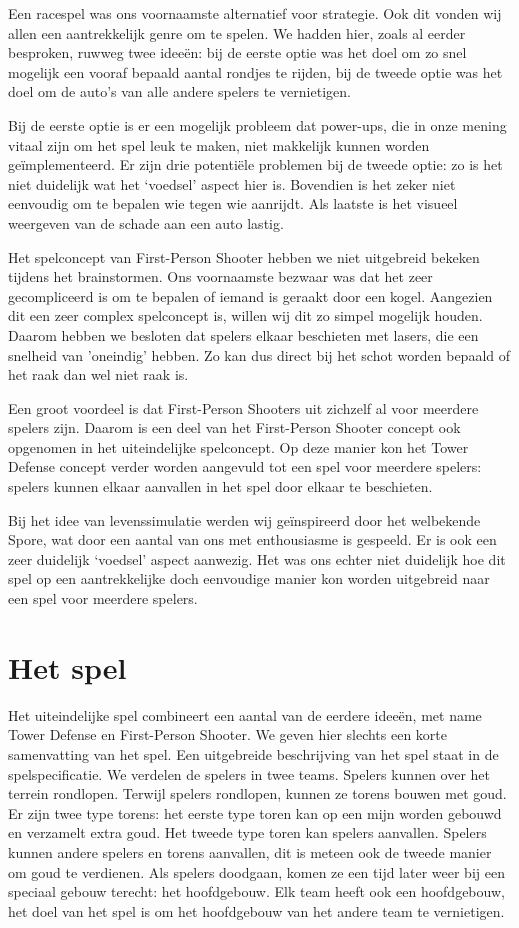 Een racespel was ons voornaamste alternatief voor strategie. Ook dit vonden wij allen een aantrekkelijk genre om te spelen. We hadden hier, zoals al eerder besproken, ruwweg twee idee\"en: bij de eerste optie was het doel om zo snel mogelijk een vooraf bepaald aantal rondjes te rijden, bij de tweede optie was het doel om de auto's van alle andere spelers te vernietigen.

Bij de eerste optie is er een mogelijk probleem dat power-ups, die in onze mening vitaal zijn om het spel leuk te maken, niet makkelijk kunnen worden ge\"implementeerd. Er zijn drie potenti\"ele problemen bij de tweede optie: zo is het niet duidelijk wat het `voedsel' aspect hier is. Bovendien is het zeker niet eenvoudig om te bepalen wie tegen wie aanrijdt. Als laatste is het visueel weergeven van de schade aan een auto lastig.

Het spelconcept van First-Person Shooter hebben we niet uitgebreid bekeken tijdens het brainstormen. Ons voornaamste bezwaar was dat het zeer gecompliceerd is om te bepalen of iemand is geraakt door een kogel. Aangezien dit een zeer complex spelconcept is, willen wij dit zo simpel mogelijk houden. Daarom hebben we besloten dat spelers elkaar beschieten met lasers, die een snelheid van 'oneindig' hebben. Zo kan dus direct bij het schot worden bepaald of het raak dan wel niet raak is.

Een groot voordeel is dat First-Person Shooters uit zichzelf al voor meerdere spelers zijn. Daarom is een deel van het First-Person Shooter concept ook opgenomen in het uiteindelijke spelconcept. Op deze manier kon het Tower Defense concept verder worden aangevuld tot een spel voor meerdere spelers: spelers kunnen elkaar aanvallen in het spel door elkaar te beschieten.

Bij het idee van levenssimulatie werden wij ge\"inspireerd door het welbekende Spore, wat door een aantal van ons met enthousiasme is gespeeld. Er is ook een zeer duidelijk `voedsel' aspect aanwezig. Het was ons echter niet duidelijk hoe dit spel op een aantrekkelijke doch eenvoudige manier kon worden uitgebreid naar een spel voor meerdere spelers.

\section{Het spel}
Het uiteindelijke spel combineert een aantal van de eerdere idee\"en, met name Tower Defense en First-Person Shooter. We geven hier slechts een korte samenvatting van het spel. Een uitgebreide beschrijving van het spel staat in de spelspecificatie. We verdelen de spelers in twee teams. Spelers kunnen over het terrein rondlopen. Terwijl spelers rondlopen, kunnen ze torens bouwen met goud. Er zijn twee type torens: het eerste type toren kan op een mijn worden gebouwd en verzamelt extra goud. Het tweede type toren kan spelers aanvallen. Spelers kunnen andere spelers en torens aanvallen, dit is meteen ook de tweede manier om goud te verdienen. Als spelers doodgaan, komen ze een tijd later weer bij een speciaal gebouw terecht: het hoofdgebouw. Elk team heeft ook een hoofdgebouw, het doel van het spel is om het hoofdgebouw van het andere team te vernietigen.

